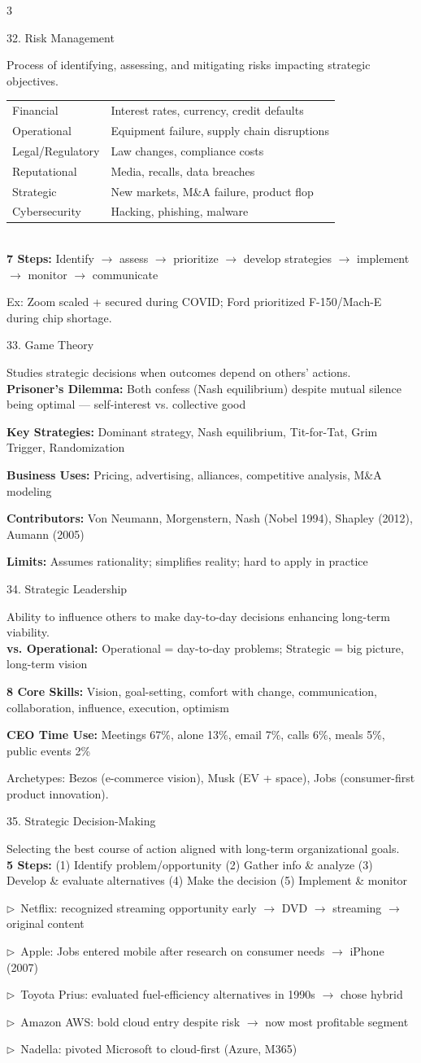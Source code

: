 \documentclass[7.5pt, letterpaper]{article}
\newcommand{\concept}[1]{%
  \vspace{2.5pt}%
  \noindent\colorbox{accent}{\parbox{\dimexpr\linewidth-2\fboxsep}{\fontsize{6.8pt}{7.5pt}\selectfont\bfseries\color{white}\strut #1\strut}}%
  \vspace{1pt}\par%
}
\newcommand{\kv}[2]{\noindent\textbf{#1:} #2\par}
\newcommand{\bul}[1]{\noindent$\triangleright$\ #1\par}
\newcommand{\minitab}[1]{%
  \begingroup
  \fontsize{6.2pt}{7pt}\selectfont
  \setlength{\tabcolsep}{2pt}
  #1
  \endgroup
}
\begin{document}
\begin{multicols}{3}
\concept{32. Risk Management}
Process of identifying, assessing, and mitigating risks impacting strategic objectives.\\
\minitab{\begin{tabular}{@{}ll@{}}
Financial & Interest rates, currency, credit defaults\\
Operational & Equipment failure, supply chain disruptions\\
Legal/Regulatory & Law changes, compliance costs\\
Reputational & Media, recalls, data breaches\\
Strategic & New markets, M\&A failure, product flop\\
Cybersecurity & Hacking, phishing, malware\\
\end{tabular}}\\
\kv{7 Steps}{Identify $\to$ assess $\to$ prioritize $\to$ develop strategies $\to$ implement $\to$ monitor $\to$ communicate}
Ex: Zoom scaled + secured during COVID; Ford prioritized F-150/Mach-E during chip shortage.

\concept{33. Game Theory}
Studies strategic decisions when outcomes depend on others' actions.\\
\kv{Prisoner's Dilemma}{Both confess (Nash equilibrium) despite mutual silence being optimal --- self-interest vs. collective good}
\kv{Key Strategies}{Dominant strategy, Nash equilibrium, Tit-for-Tat, Grim Trigger, Randomization}
\kv{Business Uses}{Pricing, advertising, alliances, competitive analysis, M\&A modeling}
\kv{Contributors}{Von Neumann, Morgenstern, Nash (Nobel 1994), Shapley (2012), Aumann (2005)}
\kv{Limits}{Assumes rationality; simplifies reality; hard to apply in practice}

\concept{34. Strategic Leadership}
Ability to influence others to make day-to-day decisions enhancing long-term viability.\\
\kv{vs. Operational}{Operational = day-to-day problems; Strategic = big picture, long-term vision}
\kv{8 Core Skills}{Vision, goal-setting, comfort with change, communication, collaboration, influence, execution, optimism}
\kv{CEO Time Use}{Meetings 67\%, alone 13\%, email 7\%, calls 6\%, meals 5\%, public events 2\%}
Archetypes: Bezos (e-commerce vision), Musk (EV + space), Jobs (consumer-first product innovation).

\concept{35. Strategic Decision-Making}
Selecting the best course of action aligned with long-term organizational goals.\\
\kv{5 Steps}{(1) Identify problem/opportunity (2) Gather info \& analyze (3) Develop \& evaluate alternatives (4) Make the decision (5) Implement \& monitor}
\bul{Netflix: recognized streaming opportunity early $\to$ DVD $\to$ streaming $\to$ original content}
\bul{Apple: Jobs entered mobile after research on consumer needs $\to$ iPhone (2007)}
\bul{Toyota Prius: evaluated fuel-efficiency alternatives in 1990s $\to$ chose hybrid}
\bul{Amazon AWS: bold cloud entry despite risk $\to$ now most profitable segment}
\bul{Nadella: pivoted Microsoft to cloud-first (Azure, M365)}


\end{multicols}
\end{document}
